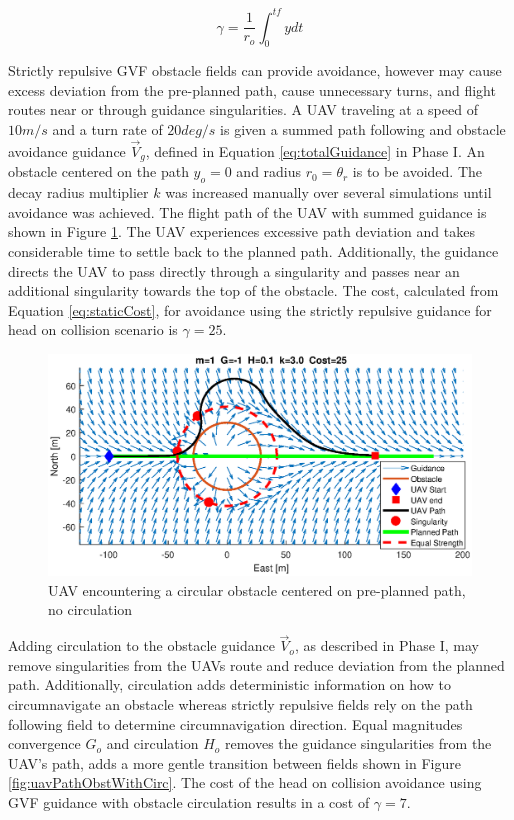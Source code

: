 \documentclass[numbered,pdftex]{ohio-etd}
\begin{document}
 \begin{equation}
 \label{eq:staticCost}
 \gamma = \frac{1}{r_o}\int_{0}^{tf}ydt
 \end{equation}
 
 
 Strictly repulsive GVF obstacle fields can provide avoidance, however may cause excess deviation from the pre-planned path, cause unnecessary turns, and flight routes near or through guidance singularities. A UAV traveling at a speed of $10m/s$ and a turn rate of $20 deg/s$ is given a summed path following and obstacle avoidance guidance $\overrightarrow{V}_g$, defined in Equation \ref{eq:totalGuidance} in Phase I. An obstacle centered on the path $y_o=0$ and radius $r_0 = \theta_r$ is to be avoided. The decay radius multiplier $k$ was increased manually over several simulations until avoidance was achieved. The flight path of the UAV with summed guidance is shown in Figure \ref{fig:uavPathObstNoCirc}. The UAV experiences excessive path deviation and takes considerable time to settle back to the planned path. Additionally, the guidance directs the UAV to pass directly through a singularity and passes near an additional singularity towards the top of the obstacle. The cost, calculated from Equation \ref{eq:staticCost}, for avoidance using the strictly repulsive guidance for head on collision scenario is $\gamma=25$.
 

\begin{figure}[H]
	\centering
	\includegraphics[trim=0 85 0 85,clip,width=15cm]{PaperFigures/Methods/bruteForceSolveN1V10}
	\caption{UAV encountering a circular obstacle centered on pre-planned path, no circulation}
	\label{fig:uavPathObstNoCirc}
\end{figure}

Adding circulation to the obstacle guidance $\overrightarrow{V}_o$, as described in Phase I, may remove singularities from the UAVs route and reduce deviation from the planned path. Additionally, circulation adds deterministic information on how to circumnavigate an obstacle whereas strictly repulsive fields rely on the path following field to determine circumnavigation direction. Equal magnitudes convergence $G_o$ and circulation $H_o$ removes the guidance singularities from the UAV's path, adds a more gentle transition between fields shown in Figure \ref{fig:uavPathObstWithCirc}. The cost of the head on collision avoidance using GVF guidance with obstacle circulation results in a cost of $\gamma=7$.
\end{document}
